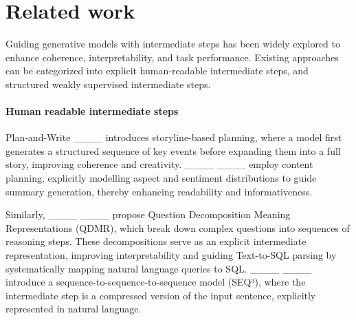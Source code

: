 \section{Related work}
Guiding generative models with intermediate steps has been widely explored to enhance coherence, interpretability, and task performance. Existing approaches can be categorized into explicit human-readable intermediate steps, and structured weakly supervised intermediate steps.

\paragraph{Human readable intermediate steps}
Plan-and-Write ____ introduces storyline-based planning, where a model first generates a structured sequence of key events before expanding them into a full story, improving coherence and creativity. %
____ ____ employ content planning, explicitly modelling aspect and sentiment distributions to guide summary generation, thereby enhancing readability and informativeness.

Similarly, ____ ____ propose Question Decomposition Meaning Representations (QDMR), which break down complex questions into sequences of reasoning steps. These decompositions serve as an explicit intermediate representation, improving interpretability and guiding Text-to-SQL parsing by systematically mapping natural language queries to SQL.
____ ____  introduce a sequence-to-sequence-to-sequence model (SEQ³), where the intermediate step is a compressed version of the input sentence, explicitly represented in natural language. 






